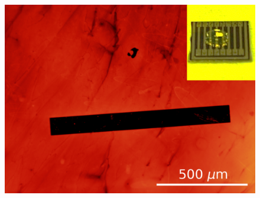 \documentclass[
  a4paper,
]{scrbook}
\begin{document}
\begin{figure}
\begin{minipage}[t]{0.45\linewidth}
{{\includegraphics{figures/ch7/modified_NGW8D9_edgechannel_post10min50Cacetonerinse_221109.png}

}

}

\end{minipage}%
%
\begin{minipage}[t]{0.01\linewidth}

{\centering 

~

}

\end{minipage}%
%
\begin{minipage}[t]{0.03\linewidth}

{\centering 


}

\end{minipage}%
%
\begin{minipage}[t]{0.01\linewidth}

{\centering 

~

}

\end{minipage}%
%
\begin{minipage}[t]{0.45\linewidth}


\end{minipage}
\end{figure}
\end{document}
